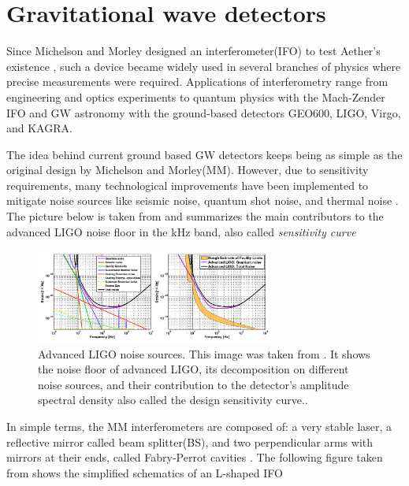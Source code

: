 \section{Gravitational wave detectors}

Since Michelson and Morley designed an interferometer(IFO) to test Aether's existence \cite{Michelson333}, such a device became widely used in several branches of physics where precise measurements were required. Applications of interferometry range from engineering and optics experiments to quantum physics with the Mach-Zender IFO and GW astronomy with the ground-based detectors GEO600, LIGO, Virgo, and KAGRA.

The idea behind current ground based GW detectors keeps being as simple as the original design by Michelson and Morley(MM). However, due to sensitivity requirements, many technological improvements have been implemented to mitigate noise sources like seismic noise, quantum shot noise, and thermal noise \cite{LIGOScientific:2013pcc}. The picture below is taken from \cite{Hild_2012} and summarizes the main contributors to the advanced LIGO noise floor in the kHz band, also called \textit{sensitivity curve}  


\begin{figure}[hbt!]
\begin{center}
\includegraphics[width=0.7\textwidth, angle=0]{images/aligo.png}
\captionsetup{width=0.8\textwidth}
\caption[Advanced LIGO noise sources]{Advanced LIGO noise sources. This image was taken from \cite{Hild_2012}. It shows the noise floor of advanced LIGO, its decomposition on different noise sources, and their contribution to the detector's amplitude spectral density also called the design sensitivity curve..}
\label{LIGO}
\end{center}
\end{figure}
\FloatBarrier

In simple terms, the MM interferometers are composed of: a very stable laser, a reflective mirror called beam splitter(BS), and two perpendicular arms with mirrors at their ends, called Fabry-Perrot cavities \cite{Saulson:1995zi}. The following figure taken from \cite{Hild_2012} shows the simplified schematics of an L-shaped IFO   


